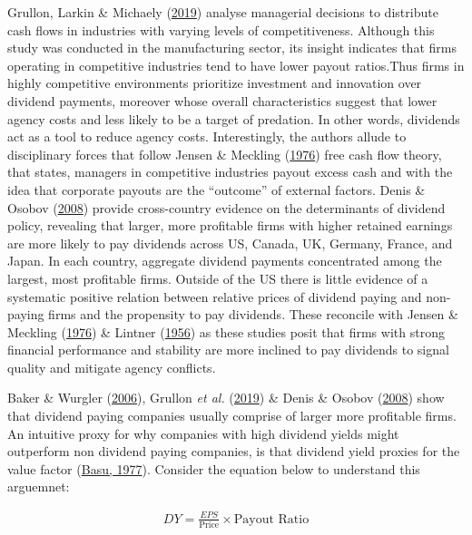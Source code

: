 \documentclass[11pt,preprint, authoryear]{elsarticle}
\numberwithin{equation}{section}
\numberwithin{figure}{section}
\numberwithin{table}{section}
\begin{document}
Grullon, Larkin \& Michaely
(\protect\hyperlink{ref-grullon2019dividend}{2019}) analyse managerial
decisions to distribute cash flows in industries with varying levels of
competitiveness. Although this study was conducted in the manufacturing
sector, its insight indicates that firms operating in competitive
industries tend to have lower payout ratios.Thus firms in highly
competitive environments prioritize investment and innovation over
dividend payments, moreover whose overall characteristics suggest that
lower agency costs and less likely to be a target of predation. In other
words, dividends act as a tool to reduce agency costs. Interestingly,
the authors allude to disciplinary forces that follow Jensen \& Meckling
(\protect\hyperlink{ref-jensen1976theory}{1976}) free cash flow theory,
that states, managers in competitive industries payout excess cash and
with the idea that corporate payouts are the ``outcome'' of external
factors. Denis \& Osobov (\protect\hyperlink{ref-denis2008firms}{2008})
provide cross-country evidence on the determinants of dividend policy,
revealing that larger, more profitable firms with higher retained
earnings are more likely to pay dividends across US, Canada, UK,
Germany, France, and Japan. In each country, aggregate dividend payments
concentrated among the largest, most profitable firms. Outside of the US
there is little evidence of a systematic positive relation between
relative prices of dividend paying and non-paying firms and the
propensity to pay dividends. These reconcile with Jensen \& Meckling
(\protect\hyperlink{ref-jensen1976theory}{1976}) \& Lintner
(\protect\hyperlink{ref-lintner1956distribution}{1956}) as these studies
posit that firms with strong financial performance and stability are
more inclined to pay dividends to signal quality and mitigate agency
conflicts.

Baker \& Wurgler (\protect\hyperlink{ref-baker2006investor}{2006}),
Grullon \emph{et al.}
(\protect\hyperlink{ref-grullon2019dividend}{2019}) \& Denis \& Osobov
(\protect\hyperlink{ref-denis2008firms}{2008}) show that dividend paying
companies usually comprise of larger more profitable firms. An intuitive
proxy for why companies with high dividend yields might outperform non
dividend paying companies, is that dividend yield proxies for the value
factor (\protect\hyperlink{ref-basu1977investment}{Basu, 1977}).
Consider the equation below to understand this arguemnet:

\begin{align*}
DY = \frac{EPS}{\text{Price}} \times \text{Payout Ratio}
\end{align*}
\end{document}
